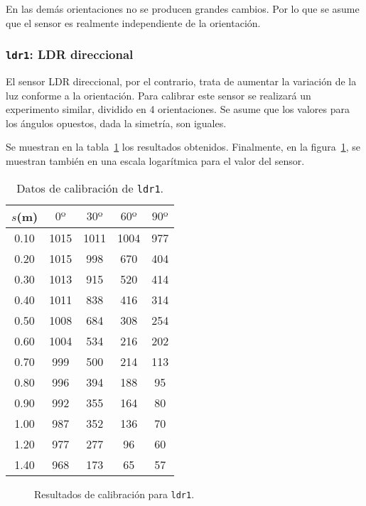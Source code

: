 \documentclass[10pt,a4paper,hidelinks,twocolumn]{article}
\begin{document}
En las demás orientaciones no se producen grandes cambios. Por lo que se asume 
que el sensor es realmente independiente de la orientación.
\subsubsection{\texttt{ldr1}: LDR direccional}
El sensor LDR direccional, por el contrario, trata de aumentar la variación de 
la luz conforme a la orientación. Para calibrar este sensor se realizará un 
experimento similar, dividido en 4 orientaciones. Se asume que los valores para 
los ángulos opuestos, dada la simetría, son iguales.

Se muestran en la tabla~\ref{tab:ldr1} los resultados obtenidos. Finalmente, en 
la figura~\ref{fig:ldr1}, se muestran también en una escala logarítmica para el 
valor del sensor.

\vfill

\begin{table}[h]
\centering
\begin{tabular}{ | c | c | c | c | c | }
\hline
$s$(m) & $0º$ & $30º$ & $60º$ & $90º$ \\ \hline
0.10 & 1015 & 1011 & 1004 & 977 \\ \hline
0.20 & 1015 & 998 & 670 & 404 \\ \hline
0.30 & 1013 & 915 & 520 & 414 \\ \hline
0.40 & 1011 & 838 & 416 & 314 \\ \hline
0.50 & 1008 & 684 & 308 & 254 \\ \hline
0.60 & 1004 & 534 & 216 & 202 \\ \hline
0.70 & 999 & 500 & 214 & 113 \\ \hline
0.80 & 996 & 394 & 188 & 95 \\ \hline
0.90 & 992 & 355 & 164 & 80 \\ \hline
1.00 & 987 & 352 & 136 & 70 \\ \hline
1.20 & 977 & 277 & 96 & 60 \\ \hline
1.40 & 968 & 173 & 65 & 57 \\ \hline
\end{tabular}
\caption{Datos de calibración de \texttt{ldr1}.\label{tab:ldr1}}
\end{table}

\begin{figure}[H]
\centering
{}
\caption{Resultados de calibración para \texttt{ldr1}.\label{fig:ldr1}}
\end{figure}
\end{document}

